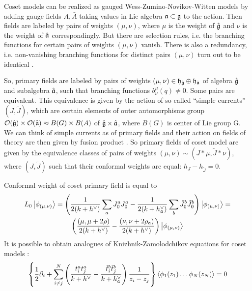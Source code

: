Coset models can be realized as gauged Wess-Zumino-Novikov-Witten models by adding gauge fields  $A, \bar{A}$ taking values in Lie algebra $\mathfrak{a}\subset \mathfrak{g}$ to the action\cite{gawdzki1988g}. Then fields are labeled by pairs of weights $(\mu,\nu)$, where $\mu$ is the weight of $\hat{\mathfrak{g}}$ and $\nu$ is the weight of $\hat{\mathfrak{a}}$ correspondingly. But there are selection rules, i.e. the branching functions for certain pairs of weights $(\mu,\nu)$ vanish. There is also a redundancy, i.e. non-vanishing branching functions for distinct pairs $(\mu,\nu)$ turn out to be identical \cite{fuchs1996resolution,schellekens1990field}.

So, primary fields are labeled by pairs of weights $(\mu,\nu)\in \mathfrak{h}_{\hat{\mathfrak{g}}}\oplus \mathfrak{h}_{\hat{\mathfrak{a}}}$  of algebra $\hat{\mathfrak{g}}$ and subalgebra $\hat{\mathfrak{a}}$, such that branching functions $b^{\mu}_{\nu}(q)\neq 0$. Some pairs are equivalent. This equivalence is given by the action of so called ``simple currents'' $(J,\tilde{J})$, which are certain elements of outer  automorphisms group $\mathcal{O}(\hat{\mathfrak{g}})\times \mathcal{O}(\hat{\mathfrak{a}})\approx B(G)\times B(A)$ of $\hat{\mathfrak{g}}\times\hat{\mathfrak{a}}$, where $B(G)$ is center of Lie group G. We can think of simple currents as of primary fields and their action on fields of theory are then given by fusion product \cite{difrancesco1997cft}.  So primary fields of coset model are given by the equivalence classes of pairs of weights $(\mu,\nu)\sim (J*\mu,\tilde{J}*\nu)$, where $(J,\tilde J)$ such that their conformal weights are equal:  $h_{J}-h_{\tilde{J}}=0$. 

Conformal weight of coset primary field is equal to
\begin{multline}
  L_0\left|\phi_{(\mu,\nu)}\right>=\left(\frac{1}{2(k+h^{\vee})}\sum_aJ^a_0J^a_0-\frac{1}{2(k+h_{\mathfrak{a}}^{\vee})}\sum_b \tilde{J}^b_0 \tilde{J}^b_0 \right)
  \left|\phi_{(\mu,\nu)}\right>=\\
  \left(\frac{(\mu,\mu+2\rho)}{2(k+h^{\vee})}-\frac{(\nu,\nu+2\rho_{\mathfrak{a}})}{2(k+h^{\vee})}\right)\left|\phi_{(\mu,\nu)}\right>
\end{multline}
It is possible to obtain analogues of Knizhnik-Zamolodchikov equations for coset models \cite{kogan1997knizhnik}:
\begin{equation}
  \left\{\frac{1}{2}\partial_{i} + \sum_{i\neq j}^{N}\left(\frac{t^{a}_{i}t^{a}_{j}}{k+h^{\vee}}-\frac{\tilde t^{b}_{i}\tilde t^{b}_{j}}{k+h^{\vee}_{\mathfrak{a}}}\right)\frac{1}{z_{i}-z_{j}}\right\} \left<\phi_{1}(z_{1})\dots \phi_{N}(z_{N})\right>=0
  \label{eq:6}
\end{equation}

